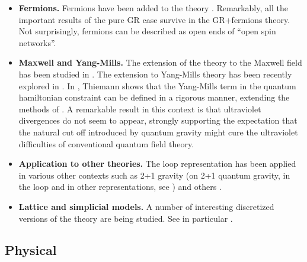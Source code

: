 \documentclass[12pt]{article}
\begin{document}
\begin{itemize}
\item {\bf Fermions.  } Fermions have been added to the theory 
\cite{MoralesRovelli,MoralesRovelli2,BaezKrasnov,ThiemannFermions}.  
Remarkably, all the 
important results of the pure GR case survive in the GR+fermions 
theory.  Not surprisingly, fermions can be described as open ends 
of ``open spin networks''.

\item {\bf Maxwell and Yang-Mills.  } The extension of the theory to 
the Maxwell field has been studied in 
\cite{Krasnov95,GambiniPullin93}.  The extension to Yang-Mills theory 
has been recently explored in \cite{ThiemannYM}.  In 
\cite{ThiemannYM}, Thiemann shows that the Yang-Mills term in the 
quantum hamiltonian constraint can be defined in a rigorous manner, 
extending the methods of \cite{Thiemann96,Thiemann96b,Thiemann96c}.  A 
remarkable result in this context is that ultraviolet divergences do 
not seem to appear, strongly supporting the expectation that the 
natural cut off introduced by quantum gravity might cure the 
ultraviolet difficulties of conventional quantum field theory.

\item {\bf Application to other theories.  } The loop 
representation has been applied in various other contexts such as 
2+1 gravity \cite{AshtekarEtAl89,Marolf93,AshtekarLoll} (on 2+1 
quantum gravity, in the loop and in other representations, see 
\cite{Carlip}) and others \cite{AshtekarRovelli}.

\item {\bf Lattice and simplicial models.  } A number of 
interesting discretized versions of the theory are being studied.  
See in particular 
\cite{Loll95a,Reisenberger,GambiniPullin,GambiniLattice}.

\end{itemize}
 
       \subsection{Physical}\label{physical}
\end{document}
